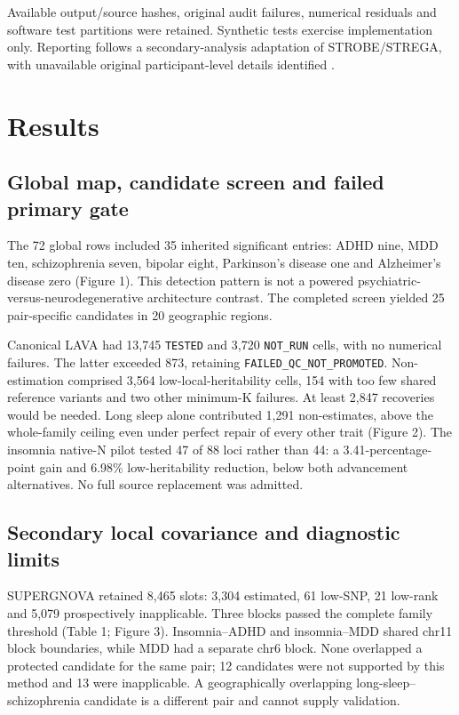\documentclass[11pt]{article}
\begin{document}
Available output/source hashes, original audit failures, numerical residuals and software test partitions were retained. Synthetic tests exercise implementation only. Reporting follows a secondary-analysis adaptation of STROBE/STREGA, with unavailable original participant-level details identified \cite{strobe,strega}.

\section*{Results}
\subsection*{Global map, candidate screen and failed primary gate}
The 72 global rows included 35 inherited significant entries: ADHD nine, MDD ten, schizophrenia seven, bipolar eight, Parkinson's disease one and Alzheimer's disease zero (Figure 1). This detection pattern is not a powered psychiatric-versus-neurodegenerative architecture contrast. The completed screen yielded 25 pair-specific candidates in 20 geographic regions.

Canonical LAVA had 13,745 \texttt{TESTED} and 3,720 \texttt{NOT\_RUN} cells, with no numerical failures. The latter exceeded 873, retaining \texttt{FAILED\_QC\_NOT\_PROMOTED}. Non-estimation comprised 3,564 low-local-heritability cells, 154 with too few shared reference variants and two other minimum-K failures. At least 2,847 recoveries would be needed. Long sleep alone contributed 1,291 non-estimates, above the whole-family ceiling even under perfect repair of every other trait (Figure 2). The insomnia native-N pilot tested 47 of 88 loci rather than 44: a 3.41-percentage-point gain and 6.98\% low-heritability reduction, below both advancement alternatives. No full source replacement was admitted.

\subsection*{Secondary local covariance and diagnostic limits}
SUPERGNOVA retained 8,465 slots: 3,304 estimated, 61 low-SNP, 21 low-rank and 5,079 prospectively inapplicable. Three blocks passed the complete family threshold (Table 1; Figure 3). Insomnia--ADHD and insomnia--MDD shared chr11 block boundaries, while MDD had a separate chr6 block. None overlapped a protected candidate for the same pair; 12 candidates were not supported by this method and 13 were inapplicable. A geographically overlapping long-sleep--schizophrenia candidate is a different pair and cannot supply validation.
\end{document}

